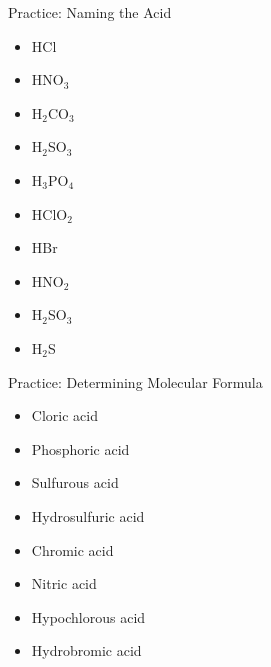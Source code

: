 \documentclass[11pt]{beamer}
\begin{document}
\begin{frame}{Practice: Naming the Acid}
  \begin{itemize}
  \item HCl
  \item HNO$_3$
  \item H$_2$CO$_3$
  \item H$_2$SO$_3$
  \item H$_3$PO$_4$
  \item HClO$_2$
  \item HBr
  \item HNO$_2$
  \item H$_2$SO$_3$
  \item H$_2$S
  \end{itemize}
\end{frame}

\begin{frame}{Practice: Determining Molecular Formula}
  \begin{itemize}
  \item Cloric acid
  \item Phosphoric acid
  \item Sulfurous acid
  \item Hydrosulfuric acid
  \item Chromic acid
  \item Nitric acid
  \item Hypochlorous acid
  \item Hydrobromic acid
  \end{itemize}
\end{frame}
\end{document}
